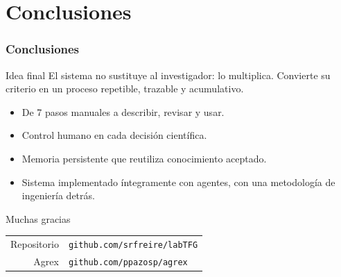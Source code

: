 \documentclass{beamer}
\begin{document}
\section{Conclusiones}

\begin{frame}
  \frametitle{Conclusiones}
  \begin{block}{Idea final}
    El sistema no sustituye al investigador: lo multiplica. Convierte su
    criterio en un proceso repetible, trazable y acumulativo.
  \end{block}

  \vspace{0.35cm}
  \begin{itemize}
    \item De 7 pasos manuales a describir, revisar y usar.
    \item Control humano en cada decisión científica.
    \item Memoria persistente que reutiliza conocimiento aceptado.
    \item Sistema implementado íntegramente con agentes, con una metodología
          de ingeniería detrás.
  \end{itemize}
\end{frame}

\begin{frame}
  \centering
  \vfill
  {\Huge{}Muchas gracias}

  \vspace{0.9cm}
  \normalsize
  \begin{tabular}{rl}
    Repositorio & \texttt{github.com/srfreire/labTFG}\\[4pt]
    Agrex & \texttt{github.com/ppazosp/agrex}\\
  \end{tabular}
  \vfill
\end{frame}
\end{document}
